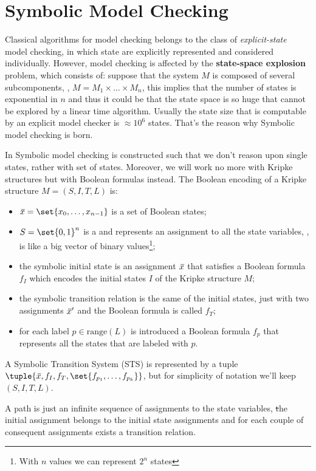 \documentclass[oneside]{academica}
\begin{document}
\section{Symbolic Model Checking}

Classical algorithms for model checking belongs to the class of \emph{explicit-state} model checking, in which state are explicitly represented and considered individually.
However, model checking is affected by the \textbf{state-space explosion} problem, which consists of: suppose that the system $M$ is composed of several subcomponents, \eg, $M = M_1 \times \dots \times M_n$, this implies that the number of states is exponential in $n$ and thus it could be that the state space is so huge that cannot be explored by a linear time algorithm.
Usually the state size that is computable by an explicit model checker is $\approx 10^6$ states.
That's the reason why Symbolic model checking is born.

In Symbolic model checking is constructed such that we don't reason upon single states, rather with set of states.
Moreover, we will work no more with Kripke structures but with Boolean formulas instead.
The Boolean encoding of a Kripke structure $M = (S,I,T,L)$ is:
\begin{itemize}
  \item $\ol{x} = \set{x_0, \dots, x_{n-1}}$ is a set of Boolean states;
  \item $S = \set{0,1}^n$ is a  and represents an assignment to all the state variables, \ie, is like a big vector of binary values\footnote{With $n$ values we can represent $2^n$ states};
  \item the symbolic initial state is an assignment $\,\overline{\!{x}}$ that satisfies a Boolean formula $f_I$ which encodes the initial states $I$ of the Kripke structure $M$;
  \item the symbolic transition relation is the same of the initial states, just with two assignments $\,\overline{\!{x}}'$ and the Boolean formula is called $f_T$;
  \item for each label $p \in \text{range}(L)$ is introduced a Boolean formula $f_p$ that represents all the states that are labeled with $p$.
\end{itemize}
A Symbolic Transition System (STS) is represented by a tuple $\tuple{\ol{x}, f_I, f_T, \set{f_{p_1}, \dots, f_{p_k}}}$, but for simplicity of notation we'll keep $(S,I,T,L)$. 

A path is just an infinite sequence of assignments to the state variables, \st the initial assignment belongs to the initial state assignments and for each couple of consequent assignments exists a transition relation.
\end{document}
